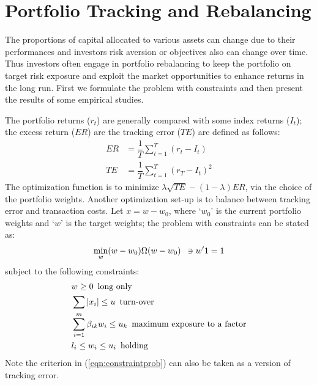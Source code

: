 \section{Portfolio Tracking and Rebalancing}


The proportions of capital allocated to various assets can change due to their performances and investors risk aversion or objectives also can change over time. Thus investors often engage in portfolio rebalancing to keep the portfolio on target risk exposure and exploit the market opportunities to enhance returns in the long run. First we formulate the problem with constraints and then present the results of some empirical studies.


The portfolio returns ($r_t$) are generally compared with some index returns ($I_t$); the excess return ($ER$) are the tracking error ($TE$) are defined as follows:
	\begin{equation}\label{eqn:excesstrack}
	\begin{split}
	ER&= \dfrac{1}{T} \sum_{t=1}^T (r_t - I_t) \\
	TE&= \dfrac{1}{T} \sum_{t=1}^T (r_T - I_t)^2
	\end{split}
	\end{equation}
The optimization function is to minimize $\lambda\sqrt{TE} - (1-\lambda)ER$, via the choice of the portfolio weights. Another optimization set-up is to balance between tracking error and transaction costs. Let $x=w-w_0$, where `$w_0$' is the current portfolio weights and `$w$' is the target weights; the problem with constraints can be stated as:
	\begin{equation}\label{eqn:constraintprob}
	\min_w (w-w_0) \Omega (w-w_0) \enskip \ni w'1=1
	\end{equation}
subject to the following constraints:
	\begin{equation}\label{eqn:constraintlist}
	\begin{split}
	&w \geq 0 \enskip \text{long only} \\
	&\sum |x_i| \leq u \enskip \text{turn-over} \\
	&\sum_{i=1}^m \beta_{ik} w_i \leq u_k \enskip \text{maximum exposure to a factor} \\
	&l_i \leq w_i \leq u_i \enskip \text{holding}
	\end{split}
	\end{equation}
Note the criterion in (\ref{eqn:constraintprob}) can also be taken as a version of tracking error. 


